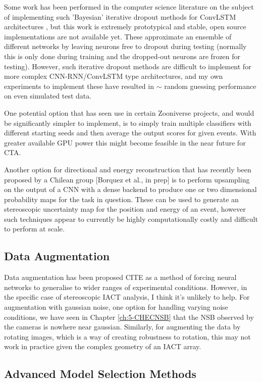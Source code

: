 Some work has been performed in the computer science literature on the subject of implementing such 'Bayesian' iterative dropout methods for ConvLSTM architectures \cite{bayesconv},  but this work is extremely prototypical and stable, open source implementations are not available yet. These approximate an ensemble of different networks by leaving neurons free to dropout during testing (normally this is only done during training and the dropped-out neurons are frozen for testing). However, such iterative dropout methods are difficult to implement for more complex CNN-RNN/ConvLSTM type architectures, and my own experiments to implement these have resulted in $\sim$ random guessing performance on even simulated test data.

One potential option that has seen use in certain Zooniverse projects, and would be significantly simpler to implement, is to simply train multiple classifiers with different starting seeds and then average the output scores for given events. With greater available GPU power this might become feasible in the near future for CTA.

Another option for directional and energy reconstruction that has recently been proposed by a Chilean group [Borquez et al., in prep] is to perform upsampling on the output of a CNN with a dense backend to produce one or two dimensional probability maps for the task in question. These can be used to generate an stereoscopic uncertainty map for the position and energy of an event, however such techniques appear to currently be highly computationally costly and difficult to perform at scale.

\subsection{Data Augmentation}
Data augmentation has been proposed CITE as a method of forcing neural networks to generalise to wider ranges of experimental conditions. However, in the specific case of stereoscopic IACT analysis, I think it's unlikely to help. For augmentation with gaussian noise, one option for handling varying noise conditions, we have seen in Chapter \ref{ch:5-CHECNSB} that the NSB observed by the cameras is nowhere near gaussian. Similarly, for augmenting the data by rotating images, which is a way of creating robustness to rotation, this may not work in practice given the complex geometry of an IACT array.
\subsection{Advanced Model Selection Methods}

